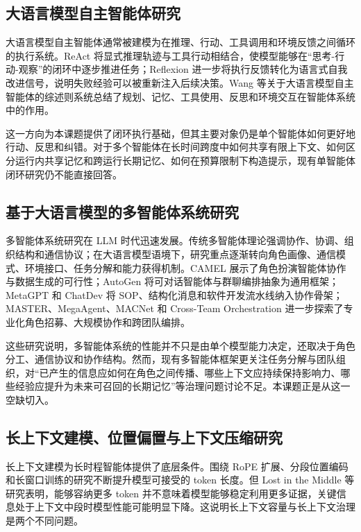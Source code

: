 \documentclass[UTF8,a4paper,zihao=-4,fontset=windows]{ctexart}
\begin{document}
\subsection{大语言模型自主智能体研究}

大语言模型自主智能体通常被建模为在推理、行动、工具调用和环境反馈之间循环的执行系统。ReAct 将显式推理轨迹与工具行动相结合，使模型能够在“思考-行动-观察”的闭环中逐步推进任务；Reflexion 进一步将执行反馈转化为语言式自我改进信号，说明失败经验可以被重新注入后续决策。Wang 等关于大语言模型自主智能体的综述则系统总结了规划、记忆、工具使用、反思和环境交互在智能体系统中的作用。

这一方向为本课题提供了闭环执行基础，但其主要对象仍是单个智能体如何更好地行动、反思和纠错。对于多个智能体在长时间跨度中如何共享有限上下文、如何区分运行内共享记忆和跨运行长期记忆、如何在预算限制下构造提示，现有单智能体闭环研究仍不能直接回答。

\subsection{基于大语言模型的多智能体系统研究}

多智能体系统研究在 LLM 时代迅速发展。传统多智能体理论强调协作、协调、组织结构和通信协议；在大语言模型语境下，研究重点逐渐转向角色画像、通信模式、环境接口、任务分解和能力获得机制。CAMEL 展示了角色扮演智能体协作与数据生成的可行性；AutoGen 将可对话智能体与群聊编排抽象为通用框架；MetaGPT 和 ChatDev 将 SOP、结构化消息和软件开发流水线纳入协作骨架；MASTER、MegaAgent、MACNet 和 Cross-Team Orchestration 进一步探索了专业化角色招募、大规模协作和跨团队编排。

这些研究说明，多智能体系统的性能并不只是由单个模型能力决定，还取决于角色分工、通信协议和协作结构。然而，现有多智能体框架更关注任务分解与团队组织，对“已产生的信息应如何在角色之间传播、哪些上下文应持续保持影响力、哪些经验应提升为未来可召回的长期记忆”等治理问题讨论不足。本课题正是从这一空缺切入。

\subsection{长上下文建模、位置偏置与上下文压缩研究}

长上下文建模为长时程智能体提供了底层条件。围绕 RoPE 扩展、分段位置编码和长窗口训练的研究不断提升模型可接受的 token 长度。但 Lost in the Middle 等研究表明，能够容纳更多 token 并不意味着模型能够稳定利用更多证据，关键信息处于上下文中段时模型性能可能明显下降。这说明长上下文容量与长上下文治理是两个不同问题。
\end{document}
